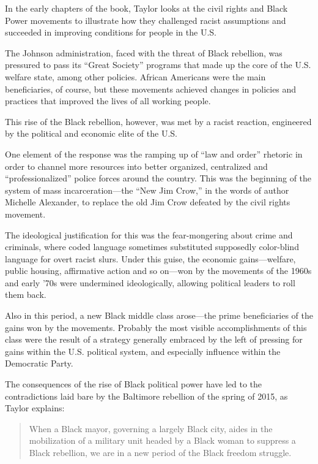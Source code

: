 \sectiondivider

In the early chapters of the book, Taylor looks at the civil rights and Black Power movements to illustrate how they challenged racist assumptions and succeeded in improving conditions for people in the U.S.

The Johnson administration, faced with the threat of Black rebellion, was pressured to pass its ``Great Society'' programs that made up the core of the U.S. welfare state, among other policies. African Americans were the main beneficiaries, of course, but these movements achieved changes in policies and practices that improved the lives of all working people.

This rise of the Black rebellion, however, was met by a racist reaction, engineered by the political and economic elite of the U.S.

One element of the response was the ramping up of ``law and order'' rhetoric in order to channel more resources into better organized, centralized and ``professionalized'' police forces around the country. This was the beginning of the system of mass incarceration---the ``New Jim Crow,'' in the words of author Michelle Alexander, to replace the old Jim Crow defeated by the civil rights movement.

The ideological justification for this was the fear-mongering about crime and criminals, where coded language sometimes substituted supposedly color-blind language for overt racist slurs. Under this guise, the economic gains---welfare, public housing, affirmative action and so on---won by the movements of the 1960s and early '70s were undermined ideologically, allowing political leaders to roll them back.

Also in this period, a new Black middle class arose---the prime beneficiaries of the gains won by the movements. Probably the most visible accomplishments of this class were the result of a strategy generally embraced by the left of pressing for gains within the U.S. political system, and especially influence within the Democratic Party.

The consequences of the rise of Black political power have led to the contradictions laid bare by the Baltimore rebellion of the spring of 2015, as Taylor explains:

\blockquote{When a Black mayor, governing a largely Black city, aides in the mobilization of a military unit headed by a Black woman to suppress a Black rebellion, we are in a new period of the Black freedom struggle.}

